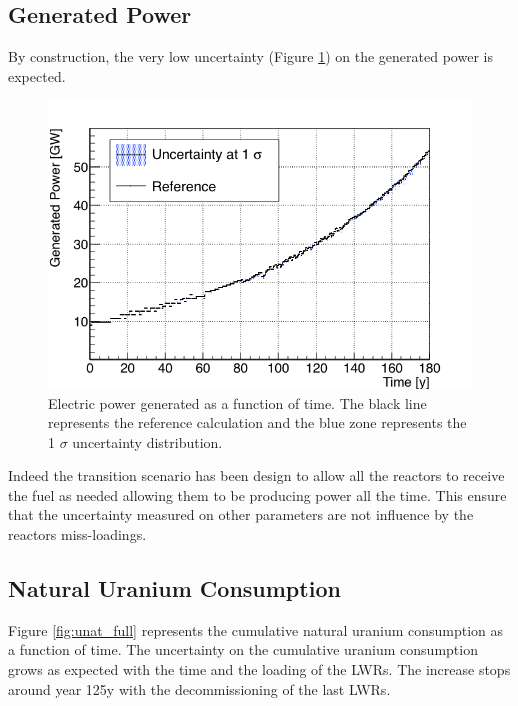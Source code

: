 \documentclass{anstrans}
\begin{document}
\subsection{Generated Power}
By construction, the very low uncertainty (Figure \ref{fig:power_full}) on the
generated power is expected.

\begin{figure}[h!] %
    \centering
    \includegraphics[scale=0.35]{power_full}
    \caption{Electric power generated as a function of time. The black line
        represents the reference calculation and the blue zone
        represents the 1 $\sigma$ uncertainty distribution.}\label{fig:power_full}
\end{figure}

Indeed the transition scenario has been design to allow all the reactors to
receive the fuel as needed allowing them to be producing power all the time.
This ensure that the uncertainty measured on other parameters are not influence
by the reactors miss-loadings.


\subsection{Natural Uranium Consumption}

Figure \ref{fig:unat_full} represents the cumulative natural uranium
consumption as a function of time. The uncertainty on the cumulative uranium
consumption grows as expected with the time and the loading of the \glspl{LWR}.
The increase stops around year 125y with the decommissioning of the last
\glspl{LWR}.
\end{document}
